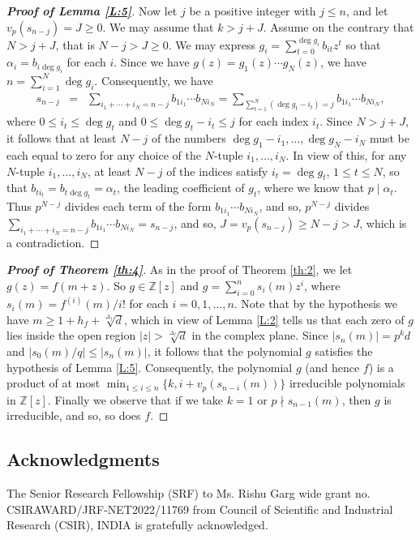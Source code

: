 \documentclass[12pt]{amsart}%
\begin{document}
\begin{proof}[\bf Proof of Lemma \ref{L:5}]
Now let $j$ be a positive integer with $j\leq n$, and let $v_p(s_{n-j})=J\geq 0$. We may assume that $k > j+J$. Assume on the contrary that $N>j+J$, that is $N-j> J\geq 0$.  We may express $g_i=\sum_{t=0}^{\deg g_i}b_{it}z^t$ so that $\alpha_i=b_{i\deg g_i}$ for each $i$. Since we have $g(z)=g_1(z)\cdots g_N(z)$, we have $n=\sum_{i=1}^N \deg g_i$. Consequently, we have
\begin{eqnarray*}
s_{n-j}&=&\sum_{i_1+\cdots+i_N=n-j}b_{1i_1}\cdots b_{Ni_N}=\sum_{\sum_{t=1}^N(\deg g_t-i_t)=j} b_{1i_1}\cdots b_{Ni_N},
\end{eqnarray*}
where $0\leq i_t\leq \deg g_t$ and $0\leq \deg g_t -i_t\leq j$ for each index $i_t$. Since $N>j+J$, it follows that at least $N-j$ of the numbers $\deg g_1-i_1,\ldots,\deg g_N-i_N$ must be each equal to zero for any choice of the $N$-tuple $i_1,\ldots,i_N$. In view of this, for any $N$-tuple $i_1,\ldots, i_N$, at least $N-j$ of the indices satisfy $i_t=\deg g_t$, $1\leq t\leq N$, so that $b_{ti_t}=b_{t\deg g_t}=\alpha_t$, the leading coefficient of $g_t$, where we know that $p\mid \alpha_t$. Thus $p^{N-j}$ divides each term of the form $b_{1i_1}\cdots b_{Ni_N}$, and so, $p^{N-j}$ divides $\displaystyle \sum_{i_1+\cdots+i_N=n-j}b_{1i_1}\cdots b_{Ni_N}=s_{n-j}$, and so, $J=v_p(s_{n-j})\geq N-j>J$, which is a contradiction.
\end{proof}
\begin{proof}[\bf Proof of Theorem \ref{th:4}]
As in the proof of Theorem \ref{th:2}, we let $g(z)=f(m+z)$. So $g\in \mathbb{Z}[z]$ and $g=\sum_{i=0}^n s_i(m) z^i$, where $s_i(m)=f^{(i)}(m)/i!$ for each $i=0,1,\ldots,n$. Note that by the hypothesis we have $m\geq 1+h_f+\sqrt[\Delta_f]{d}$,  which in view of Lemma \ref{L:2} tells us that each zero of $g$ lies inside the open region $|z|>\sqrt[\Delta_f]{d}$ in the complex plane. Since $|s_n(m)|=p^k d$ and $|s_0(m)/q|\leq |s_n(m)|$, it follows that
the polynomial $g$ satisfies the hypothesis of Lemma \ref{L:5}. Consequently, the polynomial $g$ (and hence $f$) is a product of at most $\min_{1\leq i\leq n}\{k,i+v_p(s_{n-i}(m))\}$ irreducible polynomials in $\mathbb{Z}[z]$. Finally we observe that if we take $k=1$ or $p\nmid s_{n-1}(m)$, then $g$ is irreducible, and so, so does $f$.
\end{proof}
\subsection*{Acknowledgments}
The Senior Research Fellowship (SRF) to Ms. Rishu Garg wide grant no. CSIRAWARD/JRF-NET2022/11769 from Council of Scientific and Industrial Research (CSIR), INDIA is gratefully acknowledged.
\end{document}
